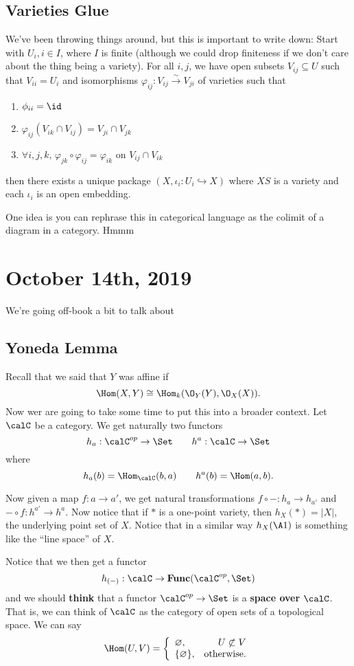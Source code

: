\documentclass[12pt]{article}
\begin{document}
\subsection{Varieties Glue}
We've been throwing things around, but this is important to write down: Start with $U_i, i\in I$, where $I$ is finite 
(although we could drop finiteness if we don't care about the thing being a variety). For all $i,j$, we have open subsets 
$V_{ij}\subseteq U$ such that $V_{ii}=U_i$ and isomorphisms $\varphi_{ij}:V_{ij}\xrightarrow{\sim}V_{ji}$ of varieties such that 
\begin{enumerate}
	\item $\phi_{ii}=\id$
	\item $\varphi_{ij}(V_{ik}\cap V_{ij})=V_{ji}\cap V_{jk}$
	\item $\forall i,j,k,\, \varphi_{jk}\circ\varphi_{ij}=\varphi_{ik}$ on $V_{ij}\cap V_{ik}$
\end{enumerate}
then there exists a unique package $(X,\iota_i:U_i\hookrightarrow X)$ where $XS$ is a variety and each $\iota_i$ is an open embedding.

One idea is you can rephrase this in categorical language as the colimit of a diagram in a category. Hmmm

\section{October 14th, 2019}
We're going off-book a bit to talk about 
\subsection{Yoneda Lemma}
Recall that we said that $Y$ was affine if 
\[\Hom(X,Y)\cong \Hom_k(\O_Y(Y),\O_X(X)).\]
Now wer are going to take some time to put this into a broader context. Let $\calC$ be a category. We get naturally two functors 
\[h_a:\calC^{op}\to\Set\qquad h^a:\calC\to\Set\]
where 
\[h_a(b)=\Hom_\calC(b,a)\qquad h^a(b)=\Hom(a,b).\]

Now given a map $f:a\to a'$, we get natural transformations $f\circ -:h_a\to h_{a'}$ and $-\circ f:h^{a'}\to h^a$. Now notice that 
if $\ast$ is a one-point variety, then $h_X(\ast)=|X|$, the underlying point set of $X$. Notice that in a similar way 
$h_X(\A1)$ is something like the ``line space'' of $X$.

Notice that we then get a functor
\[h_{(-)}:\calC\to\mathbf{Func}(\calC^{op},\Set)\]
and we should \textbf{think} that a functor $\calC^{op}\to\Set$ is a \textbf{space over $\calC$}. That is, we can think of 
$\calC$ as the category of open sets of a topological space. We can say 
\[\Hom(U,V)=\left\{\begin{array}{lr}
	\varnothing, & U\not\subset V\\
	\{\varnothing\}, & \text{otherwise}.
\end{array}\right.\]
\end{document}
